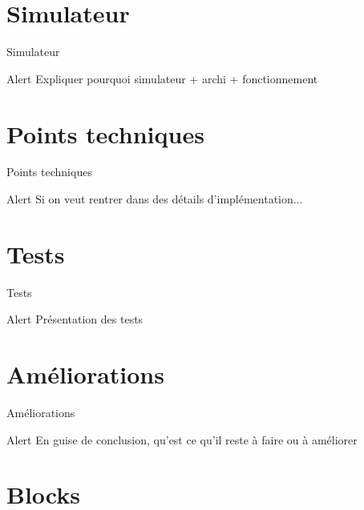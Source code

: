 \documentclass{beamer}
\begin{document}
\section{Simulateur}

\begin{frame}{Simulateur}

\begin{alertblock}{Alert}
    Expliquer pourquoi simulateur + archi + fonctionnement
\end{alertblock}
\end{frame}


\section{Points techniques}

\begin{frame}{Points techniques}

\begin{alertblock}{Alert}
    Si on veut rentrer dans des détails d'implémentation...
\end{alertblock}
\end{frame}


\section{Tests}

\begin{frame}{Tests}

\begin{alertblock}{Alert}
    Présentation des tests
\end{alertblock}
\end{frame}


\section{Améliorations}

\begin{frame}{Améliorations}

\begin{alertblock}{Alert}
    En guise de conclusion, qu'est ce qu'il reste à faire ou à améliorer
\end{alertblock}
\end{frame}




\section{Blocks}
\end{document}
